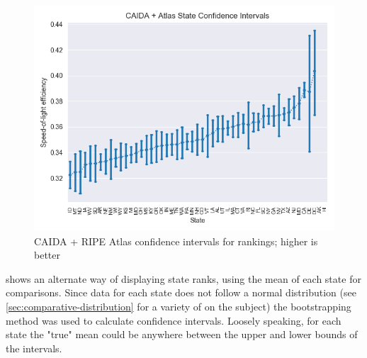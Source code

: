\begin{figure}[h]
    \centering
    \includegraphics{images/comparative/confidence_intervals/caida_confidence_interval.png}
    \caption{CAIDA + RIPE Atlas confidence intervals for rankings; higher is better}
    \label{fig:caida_confidence_intervals}
\end{figure}

 shows an alternate way of displaying state ranks, using the mean of each state for comparisons. Since data for each state does not follow a normal distribution (see \cref{sec:comparative-distribution} for a variety of \kdes on the subject) the bootstrapping method was used to calculate confidence intervals. Loosely speaking, for each state the "true" mean could be anywhere between the upper and lower bounds of the intervals.
